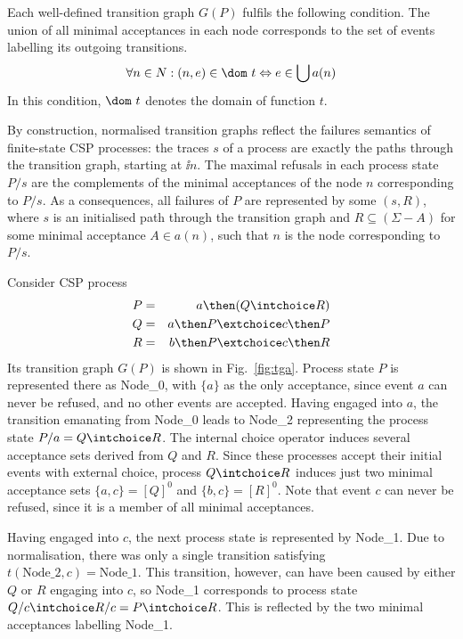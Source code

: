 Each well-defined transition graph $G(P)$ fulfils the following condition. The union of all minimal acceptances in each node corresponds to the set of events labelling its outgoing transitions.
\begin{equation}
\label{eq:wellformedg}
\forall n\in N: (n,e)\in\dom~t \Leftrightarrow e\in\bigcup a(n)
\end{equation}
In this condition, $\dom~t$ denotes the domain of function $t$. 

By construction, normalised transition graphs reflect the failures semantics of finite-state CSP processes: 
the traces $s$ of a process are exactly the paths through the transition graph, 
starting at $\ii n$. The maximal refusals in each process state $P/s$
 are the complements of 
the minimal acceptances of the node $n$ 
corresponding to $P/s$. As a consequences, all failures 
of $P$ are represented by some $(s,R)$, where $s$ is an initialised path through the transition graph and $R\subseteq (\Sigma-A)$ for some minimal acceptance $A\in a(n)$, 
such that $n$ is the node corresponding to $P/s$. 

\begin{example}\label{ex:a}
Consider CSP process 
\begin{eqnarray*}
P & = & a \then (Q\intchoice R)
\\
Q & = & a \then P \extchoice c \then P
\\
R & = & b \then P \extchoice c \then R
\end{eqnarray*}
Its transition graph $G(P)$ is shown in Fig.~\ref{fig:tga}. Process state $P$ is represented there as Node\_0, with $\{ a\}$ as the only acceptance, since event $a$ can never be refused, and no other events are accepted. Having engaged into $a$, the transition emanating from Node\_0 leads to Node\_2 representing  the process state 
$P/a = Q\intchoice R$. The internal choice operator induces several acceptance sets derived from $Q$ and $R$. Since these processes accept their initial events with external choice, 
process $Q\intchoice R$ induces just two minimal acceptance sets $\{a,c\} = [Q]^0$ and
$\{b,c\} = [R]^0$. Note that event $c$ can never be refused, since it is a member of all minimal acceptances. 

Having engaged into $c$, the next process state is represented by Node\_1. Due to normalisation, there was only a single transition satisfying 
$t(\text{Node\_2},c) = \text{Node\_1}$. This transition, however, can have been caused 
by either $Q$ or $R$ engaging into $c$, so Node\_1 corresponds to process state
$Q/c \intchoice R/c = P \intchoice R$. This is reflected by the two minimal acceptances
labelling Node\_1. 
\xbox
\end{example}



